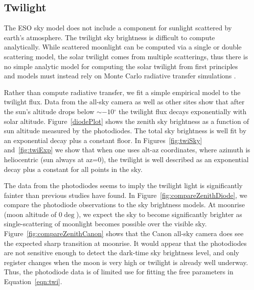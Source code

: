 \documentclass[]{spie}
\newcommand\degree{{^\circ}}
\begin{document}
\subsection{Twilight}

The ESO sky model does not include a component for sunlight scattered by earth's atmosphere.  The twilight sky brightness is difficult to compute analytically.  While scattered moonlight can be computed via a single or double scattering model, the solar twilight comes from multiple scatterings, thus there is no simple analytic model for computing the solar twilight from first principles and models must instead rely on Monte Carlo radiative transfer simulations \citep{Patat06}.

Rather than compute radiative transfer, we fit a simple empirical model to the twilight flux.  Data from the all-sky camera as well as other sites show that after the sun's altitude drops below $\sim-10\degree$ the twilight flux decays exponentially with solar altitude. Figure~\ref{diodePlot} shows the zenith sky brightness as a function of sun altitude measured by the photodiodes. The total sky brightness is well fit by an exponential decay plus a constant floor.  In Figures~\ref{fig:twiSky} and~\ref{fig:twiExp} we show that when one uses alt-az coordinates, where azimuth is heliocentric (sun always at az=0), the twilight is well described as an exponential decay plus a constant for all points in the sky.

The data from the photodiodes seems to imply the twilight light is significantly fainter than previous studies have found. In Figure~\ref{fig:compareZenithDiode}, we compare the photodiode observations to the sky brightness models. At moonrise (moon altitude of 0$\deg$), we expect the sky to become significantly brighter as single-scattering of moonlight becomes possible over the visible sky.  Figure~\ref{fig:compareZenithCanon} shows that the Canon all-sky camera does see the expected sharp transition at moonrise.  It would appear that the photodiodes are not sensitive enough to detect the dark-time sky brightness level, and only register changes when the moon is very high or twilight is already well underway. Thus, the photodiode data is of limited use for fitting the free parameters in Equation~\ref{eqn:twi}.





\begin{figure*}
  \caption{Photodiode observations of zenith at the LSST site. The light gray points show individual measurements, while the yellow points are the median-binned data. The solid blue line shows the best fit exponential decay plus constant. The green vertical line marks 12 degree twilight, and the dashed vertical blue line shows where the data was not used because the detector was often saturated at that point. \label{diodePlot}}
\end{figure*}
\end{document}
